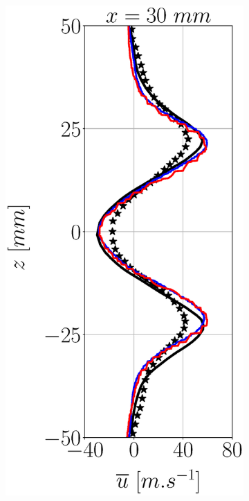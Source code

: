\begin{figure}[h!]
\centering
\begin{subfigure}[b]{0.22\textwidth}
	\centering
   \includegraphics[scale=0.25]{./part3_applications/figures_ch7_aero/BIMER_validation_quantitative_lines/x30_u_axial_mean.eps} 

\end{subfigure}
\end{figure}
